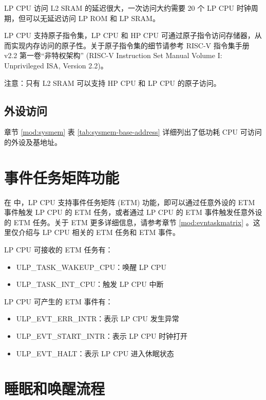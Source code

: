 \documentclass[main\_\_CN.tex]{subfiles}
\begin{document}
\begin{tiplisting}
LP CPU 访问 L2 SRAM 的延迟很大，一次访问大约需要 20 个 LP CPU 时钟周期，但可以无延迟访问 LP ROM 和 LP SRAM。
\end{tiplisting}

LP CPU 支持原子指令集，LP CPU 和 HP CPU 可通过原子指令访问存储器，从而实现内存访问的原子性。关于原子指令集的细节请参考 RISC-V 指令集手册 v2.2 第一卷“非特权架构” (RISC-V Instruction Set Manual Volume I: Unprivileged ISA, Version 2.2)。

注意：只有 L2 SRAM 可以支持 HP CPU 和 LP CPU 的原子访问。

\subsection{外设访问}
\label{sec:ulp-etm-func}

章节 \ref{mod:sysmem} \textit{} 表 \ref{tab:sysmem-base-address} 详细列出了低功耗 CPU 可访问的外设及基地址。

\section{事件任务矩阵功能}
在 \chipname{} 中，LP CPU 支持事件任务矩阵 (ETM) 功能，即可以通过任意外设的 ETM 事件触发 LP CPU 的 ETM 任务，或者通过 LP CPU 的 ETM 事件触发任意外设的 ETM 任务。关于 ETM 更多详细信息，请参考章节 \ref{mod:evntaskmatrix} 。这里仅介绍与 LP CPU 相关的 ETM 任务和 ETM 事件。

LP CPU 可接收的 ETM 任务有：

\begin{itemize}
    \item ULP\_TASK\_WAKEUP\_CPU：唤醒 LP CPU
    \item ULP\_TASK\_INT\_CPU：触发 LP CPU 中断
\end{itemize}

LP CPU 可产生的 ETM 事件有：

\begin{itemize}
    \item ULP\_EVT\_ERR\_INTR：表示 LP CPU 发生异常
    \item ULP\_EVT\_START\_INTR：表示 LP CPU 时钟打开
    \item ULP\_EVT\_HALT：表示 LP CPU 进入休眠状态

\end{itemize}




\section{睡眠和唤醒流程}\label{sec:sleep}
\end{document}
